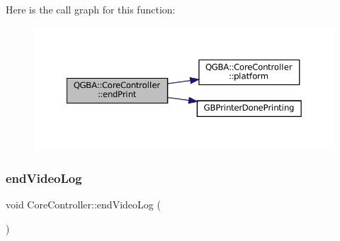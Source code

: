 Here is the call graph for this function\+:
\nopagebreak
\begin{figure}[H]
\begin{center}
\leavevmode
\includegraphics[width=350pt]{class_q_g_b_a_1_1_core_controller_a387b03d053fb40544d02ac1e58e59c0d_cgraph}
\end{center}
\end{figure}
\mbox{\label{class_q_g_b_a_1_1_core_controller_a71a8499d2b02fc6b86b13cd82080799f}} 
\subsubsection{\texorpdfstring{end\+Video\+Log}{endVideoLog}}
{\footnotesize\ttfamily void Core\+Controller\+::end\+Video\+Log (\begin{DoxyParamCaption}{ }\end{DoxyParamCaption})\hspace{0.3cm}{\ttfamily [slot]}}

